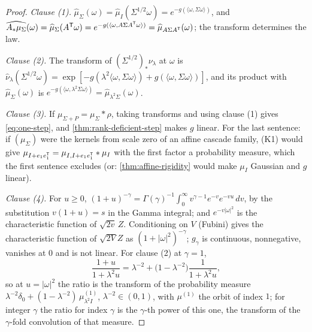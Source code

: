 \begin{proof}
\leanok
\emph{Clause (1).} $\widehat\mu_\Sigma(\omega) = \widehat\mu_I(\Sigma^{1/2}\omega)
= e^{-g(\langle\omega,\Sigma\omega\rangle)}$, and
$\widehat{A_*\mu_\Sigma}(\omega) = \widehat\mu_\Sigma(A^{\mathsf{T}}\omega)
= e^{-g(\langle\omega,A\Sigma A^{\mathsf{T}}\omega\rangle)} = \widehat\mu_{A\Sigma A^{\mathsf{T}}}(\omega)$; the
transform determines the law.

\emph{Clause (2).} The transform of $(\Sigma^{1/2})_*\nu_\lambda$ at $\omega$ is
$\widehat\nu_\lambda(\Sigma^{1/2}\omega) = \exp[-g(\lambda^2\langle\omega,\Sigma\omega\rangle) +
g(\langle\omega,\Sigma\omega\rangle)]$, and its product with $\widehat\mu_\Sigma(\omega)$ is
$e^{-g(\langle\omega,\lambda^2\Sigma\omega\rangle)} = \widehat\mu_{\lambda^2\Sigma}(\omega)$.

\emph{Clause (3).} If $\mu_{\Sigma+P} = \mu_\Sigma * \rho$, taking transforms and using clause (1)
gives \ref{eq:one-step}, and \ref{thm:rank-deficient-step} makes $g$ linear. For the last
sentence: if $(\mu_\Sigma)$ were the kernels from scale zero of an affine cascade family, (K1)
would give $\mu_{I + e_1e_1^{\mathsf{T}}} = \mu_{I,I+e_1e_1^{\mathsf{T}}} * \mu_I$ with the first factor a
probability measure, which the first sentence excludes (or: \ref{thm:affine-rigidity} would make
$\mu_I$ Gaussian and $g$ linear).

\emph{Clause (4).} For $u \ge 0$,
$(1+u)^{-\gamma} = \Gamma(\gamma)^{-1}\int_0^\infty v^{\gamma-1}e^{-v}e^{-vu}\,dv$, by the
substitution $v(1+u) = s$ in the Gamma integral; and $e^{-v|\omega|^2}$ is the characteristic
function of $\sqrt{2v}\,Z$. Conditioning on $V$ (Fubini) gives the characteristic function of
$\sqrt{2V}Z$ as $(1+|\omega|^2)^{-\gamma}$; $g_\gamma$ is continuous, nonnegative, vanishes at $0$
and is not linear. For clause (2) at $\gamma = 1$,
\[
  \frac{1+u}{1+\lambda^2u} = \lambda^{-2} + \bigl(1 - \lambda^{-2}\bigr)\frac{1}{1+\lambda^2u} ,
\]
so at $u = |\omega|^2$ the ratio is the transform of the probability measure
$\lambda^{-2}\delta_0 + (1-\lambda^{-2})\,\mu^{(1)}_{\lambda^2 I}$, $\lambda^{-2} \in (0,1)$, with
$\mu^{(1)}$ the orbit of index $1$; for integer $\gamma$ the ratio for index $\gamma$ is the
$\gamma$-th power of this one, the transform of the $\gamma$-fold convolution of that measure.


\end{proof}
